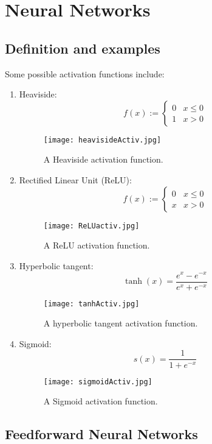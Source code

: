 \documentclass[titlepage]{article}
\theoremstyle{plain}
\theoremstyle{definition}
\begin{document}
	
	\section{Neural Networks}\label{NeurNets}		
		\subsection{Definition and examples}\label{NNdefs}
		
		
		
		Some possible activation functions include:
		\begin{enumerate}
			\item Heaviside:
				\[ f(x) := \begin{cases} 
				0 & x \leq 0 \\
				1 & x > 0  
				\end{cases}
				\]
				\begin{figure}[H]
					\centering
					\texttt{[image: heavisideActiv.jpg]}
					\caption{A Heaviside activation function.}
					\label{fig:heavisideActiv}
				\end{figure}
			\item Rectified Linear Unit (ReLU):
				\[ f(x) := \begin{cases} 
				0 & x \leq 0 \\
				x & x > 0 
				\end{cases}
				\]
				\begin{figure}[H]
					\centering
					\texttt{[image: ReLUactiv.jpg]}
					\caption{A ReLU activation function.}
					\label{fig:ReLUActiv}
				\end{figure}
			\item Hyperbolic tangent:
				$$
					\tanh(x)=\frac{e^{x}-e^{-x}}{e^{x}+e^{-x}}
				$$
				\begin{figure}[H]
					\centering
					\texttt{[image: tanhActiv.jpg]}
					\caption{A hyperbolic tangent activation function.}
					\label{fig:tanhActiv}
				\end{figure}
			\item Sigmoid:
				$$
					s(x)=\frac{1}{1+e^{-x}}
				$$
				\begin{figure}[H]
					\centering
					\texttt{[image: sigmoidActiv.jpg]}
					\caption{A Sigmoid activation function.}
					\label{fig:sigmoidActiv}
				\end{figure}
		\end{enumerate}
		
		\subsection{Feedforward Neural Networks}\label{ffNNs}
	
\end{document}
